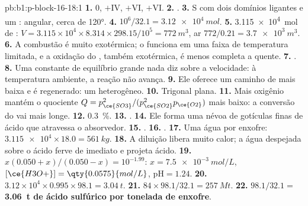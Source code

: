 \begin{solution}{pb:b1:p-block-16-18:1}
\textbf{1.} 0, $+$IV, $+$VI, $+$VI.
\textbf{2.} .
\textbf{3.} S com dois domínios ligantes e um : angular,
cerca de \ang{120}.
\textbf{4.} $10^6/32.1 = \qty{3.12e4}{mol}$.
\textbf{5.} \qty{3.115e4}{mol} de : $V = 3.115 \times 10^4 \times
8.314 \times 298.15/10^5 = \qty{772}{m^3}$, ar $772/0.21 = \qty{3.7e3}{m^3}$.
\textbf{6.} A combustão é muito exotérmica; o  funciona em uma
faixa de temperatura limitada, e a oxidação do , também
exotérmica, é menos completa a quente.
\textbf{7.} .
\textbf{8.} Uma constante de equilíbrio grande nada diz sobre a
velocidade: à temperatura ambiente, a reação não avança.
\textbf{9.} Ele oferece um caminho de  mais baixa e é
regenerado: um  heterogêneo.
\textbf{10.} Trigonal plana.
\textbf{11.} Mais oxigênio mantém o quociente
$Q = p_{\ce{SO3}}^2/(p_{\ce{SO2}}^2 p_{\ce{O2}})$ mais baixo: a conversão
do  vai mais longe.
\textbf{12.} \qty{0.3}{\percent}.
\textbf{13.} .
\textbf{14.} Ele forma uma névoa de gotículas finas de ácido que atravessa
o absorvedor.
\textbf{15.} .
\textbf{16.} .
\textbf{17.} Uma água por enxofre: $\num{3.115e4} \times 18.0 =
\qty{561}{kg}$.
\textbf{18.} A diluição libera muito calor; a água despejada sobre o
ácido ferve de imediato e projeta ácido.
\textbf{19.} $x(0.050 + x)/(0.050 - x) = 10^{-1.99}$: $x = \qty{7.5e-3}{mol/L}$,
$[\ce{H3O+}] = \qty{0.0575}{mol/L}$, $\mathrm{pH} = 1.24$.
\textbf{20.} $3.12 \times 10^4 \times 0.995 \times 98.1 = \qty{3.04}{t}$.
\textbf{21.} $84 \times 98.1/32.1 = \qty{257}{Mt}$.
\textbf{22.} $98.1/32.1 =$ \textbf{\qty{3.06}{t} de ácido sulfúrico por
tonelada de enxofre}.
\end{solution}

